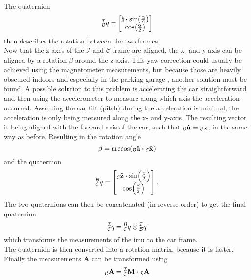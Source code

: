The quaternion
\begin{equation}
	\qtf{i}{b} =
	\begin{bmatrix}
		\vb{j}\vdot\sin(\frac{\alpha}{2}) \\
		\cos(\frac{\alpha}{2})
	\end{bmatrix}
\end{equation}
then describes the rotation between the two frames.\\
Now that the z-axes of the $\mathcal{I}$ and $\mathcal{C}$ frame are aligned, the x- and y-axis can be aligned by a rotation $\beta$ around the z-axis.
This yaw correction could usually be achieved using the magnetometer measurements, but because those are heavily obscured indoors and especially in the parking garage \cite{Li2012}, another solution must be found.
A possible solution to this problem is accelerating the car straightforward and then using the accelerometer to measure along which axis the acceleration occurred.
Assuming the car tilt (pitch) during the acceleration is minimal, the acceleration is only being measured along the x- and y-axis.
The resulting vector is being aligned with the forward axis of the car, such that $\vincs{\hat{a}}{b} = \vincs{x}{c}$, in the same way as before.
Resulting in the rotation angle
\begin{equation}
	\beta = \arccos(\vincs{\vu{a}}{b} \vdot \vincs{\hat{x}}{c})
\end{equation}
and the quaternion
\begin{equation}
	\qtf{b}{c} =
	\begin{bmatrix}
		\vincs{\hat{z}}{c}\vdot\sin(\frac{\beta}{2}) \\
		\cos(\frac{\beta}{2})
	\end{bmatrix}.
\end{equation}
The two quaternions can then be concatenated (in reverse order) to get the final quaternion
\begin{equation}
	\qtf{i}{c} = \qtf{b}{c} \otimes  \qtf{i}{b}
\end{equation}
which transforms the measurements of the \gls{imu} to the car frame.\\
The quaternion is then converted into a rotation matrix, because it is faster.
Finally the measurements $\mathbf{A}$ can be transformed using
\begin{equation}
	\vincs{A}{c} = \mtf{i}{c} \vdot \vincs{A}{i}
\end{equation}

